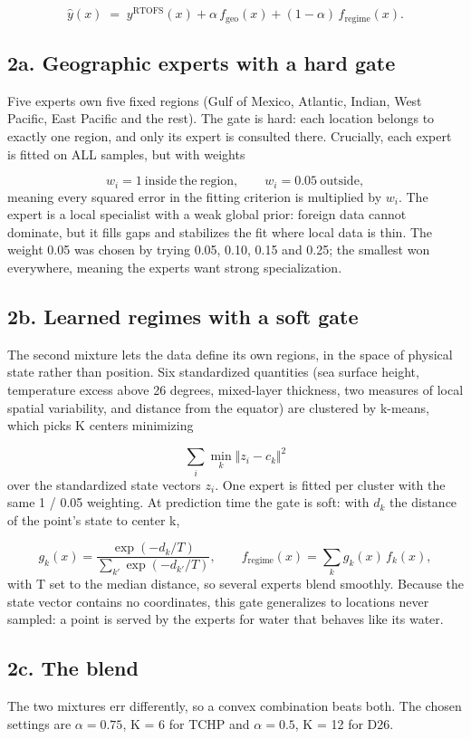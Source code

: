 \documentclass[11pt]{article}
\begin{document}
\[ \hat{y}(x) \;=\; y^{\mathrm{RTOFS}}(x) + \alpha\, f_{\mathrm{geo}}(x) + (1-\alpha)\, f_{\mathrm{regime}}(x). \]
\subsection*{2a. Geographic experts with a hard gate}
Five experts own five fixed regions (Gulf of Mexico, Atlantic, Indian, West Pacific, East Pacific and the rest). The gate is hard: each location belongs to exactly one region, and only its expert is consulted there. Crucially, each expert is fitted on ALL samples, but with weights

\[ w_i = 1\ \mathrm{inside\ the\ region}, \qquad w_i = 0.05\ \mathrm{outside}, \]
meaning every squared error in the fitting criterion is multiplied by $w_i$. The expert is a local specialist with a weak global prior: foreign data cannot dominate, but it fills gaps and stabilizes the fit where local data is thin. The weight 0.05 was chosen by trying 0.05, 0.10, 0.15 and 0.25; the smallest won everywhere, meaning the experts want strong specialization.

\subsection*{2b. Learned regimes with a soft gate}
The second mixture lets the data define its own regions, in the space of physical state rather than position. Six standardized quantities (sea surface height, temperature excess above 26 degrees, mixed-layer thickness, two measures of local spatial variability, and distance from the equator) are clustered by k-means, which picks K centers minimizing

\[ \sum_{i} \min_{k} \Vert z_i - c_k \Vert^2 \]
over the standardized state vectors $z_i$. One expert is fitted per cluster with the same 1 / 0.05 weighting. At prediction time the gate is soft: with $d_k$ the distance of the point's state to center k,

\[ g_k(x) = \frac{\exp(-d_k/T)}{\sum_{k'} \exp(-d_{k'}/T)}, \qquad f_{\mathrm{regime}}(x)=\sum_k g_k(x)\, f_k(x), \]
with T set to the median distance, so several experts blend smoothly. Because the state vector contains no coordinates, this gate generalizes to locations never sampled: a point is served by the experts for water that behaves like its water.

\subsection*{2c. The blend}
The two mixtures err differently, so a convex combination beats both. The chosen settings are $\alpha = 0.75$, K = 6 for TCHP and $\alpha = 0.5$, K = 12 for D26.
\end{document}
